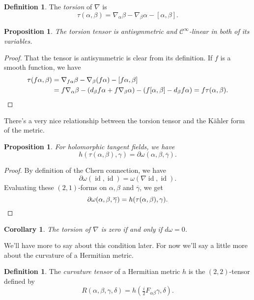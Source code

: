 \documentclass[11pt]{article}
\newtheorem{prop}[theo]{Proposition}
\newtheorem{coro}[theo]{Corollary}
\theoremstyle{definition}
\newtheorem{defi}[theo]{Definition}
\newcommand{\cc}[1]{\mathcal{#1}}
\DeclareMathOperator{\id}{id}
\begin{document}
\begin{defi}
The \emph{torsion} of $\nabla$ is
$$
\tau(\alpha,\beta)
= \nabla_\alpha \beta - \nabla_\beta \alpha - [\alpha, \beta].
$$
\end{defi}

\begin{prop}
The torsion tensor is antisymmetric and $\cc C^\infty$-linear in both of its variables.
\end{prop}

\begin{proof}
  That the tensor is antisymmetric is clear from its definition. If $f$ is a smooth function, we have
\begin{align*}
\tau(f\alpha,\beta)
&= \nabla_{f\alpha}\beta - \nabla_\beta(f\alpha) - [f\alpha,\beta]
\\
&= f\nabla_\alpha \beta - (d_\beta f \alpha + f \nabla_\beta \alpha) - (f[\alpha,\beta] - d_\beta f \alpha)
= f \tau(\alpha,\beta).
\qedhere
\end{align*}
\end{proof}

There's a very nice relationship between the torsion tensor and the K\"ahler form of the metric.

\begin{prop}
For holomorphic tangent fields, we have
$$
h(\tau(\alpha,\beta), \gamma)
= \partial\omega(\alpha,\beta,\overline\gamma).
$$
\end{prop}

\begin{proof}
By definition of the Chern connection, we have
$$
\partial \omega(\id, \id)
= \omega(\nabla \id, \id).
$$
Evaluating these $(2,1)$-forms on $\alpha, \beta$ and $\overline\gamma$, we get
\[
\partial\omega(\alpha,\beta,\overline{\gamma})
= h(\tau(\alpha,\beta), \gamma).
\qedhere
\]
\end{proof}

\begin{coro}
\label{kahler-zero-torsion}
The torsion of $\nabla$ is zero if and only if $d\omega = 0$.
\end{coro}


We'll have more to say about this condition later. For now we'll say a little more about the curvature of a Hermitian metric.


\begin{defi}
The \emph{curvature tensor} of a Hermitian metric $h$ is the $(2,2)$-tensor defined by
$$
R(\alpha,\beta,\gamma,\delta)
= h(\tfrac i2 F_{\alpha\beta}\gamma, \delta).
$$
\end{defi}
\end{document}
